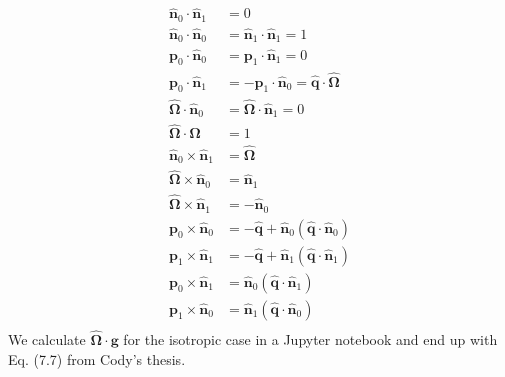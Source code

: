 \documentclass[reqno]{article}
\newcommand{\Omegahat}{\hat{\boldsymbol{\Omega}}}
\newcommand{\n}{\mathbf{\hat{n}}}
\newcommand{\p}{\mathbf{p}}
\newcommand{\q}{\mathbf{\hat{q}}}
\begin{document}
\begin{equation}
\begin{split}
    \n_0 \cdot \n_1 &= 0 \\
    \n_0 \cdot \n_0 &= \n_1 \cdot \n_1 = 1 \\
    \p_0 \cdot \n_0 &= \p_1 \cdot \n_1 = 0 \\
    \p_0 \cdot \n_1 &= -\p_1 \cdot \n_0 = \q \cdot \Omegahat \\
    \Omegahat \cdot \n_0 &= \Omegahat \cdot \n_1 = 0 \\
    \Omegahat \cdot \Omegahat &= 1 \\
    \n_0 \times \n_1 &= \Omegahat \\
    \Omegahat \times \n_0 &= \n_1 \\
    \Omegahat \times \n_1 &= -\n_0 \\
    \p_0 \times \n_0 &= -\q + \n_0 \left( \q \cdot \n_0 \right) \\
    \p_1 \times \n_1 &= -\q + \n_1 \left( \q \cdot \n_1 \right) \\
    \p_0 \times \n_1 &= \n_0 \left( \q \cdot \n_1 \right) \\
    \p_1 \times \n_0 &= \n_1 \left( \q \cdot \n_0 \right) \\
\end{split}
\end{equation}
We calculate $\Omegahat \cdot \mathbf{g}$ for the isotropic case in a Jupyter notebook and end up with Eq. (7.7) from Cody's thesis.
\end{document}
